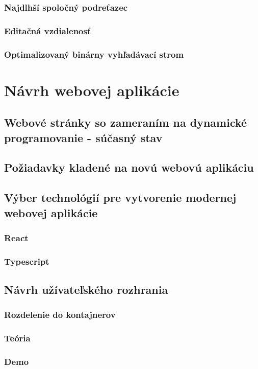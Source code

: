 \subsection{Najdlhší spoločný podreťazec}
\subsection{Editačná vzdialenosť}
\subsection{Optimalizovaný binárny vyhľadávací strom}

\chapter{Návrh webovej aplikácie} 
\label{navrhAplikacie}
\section{Webové stránky so zameraním na dynamické programovanie - súčasný stav}
\section{Požiadavky kladené na novú webovú aplikáciu}
\section{Výber technológií pre vytvorenie modernej webovej aplikácie}
\subsection{React}
\subsection{Typescript}
\section{Návrh užívateľského rozhrania}
\subsection{Rozdelenie do kontajnerov}
\subsection{Teória}
\subsection{Demo}
